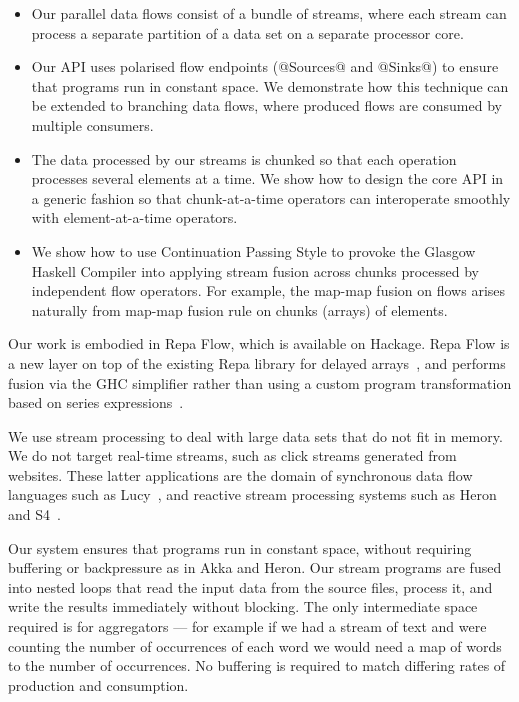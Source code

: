 \begin{itemize}
\item Our parallel data flows consist of a bundle of streams, where each stream can process a separate partition of a data set on a separate processor core.

\item Our API uses polarised flow endpoints (@Sources@ and @Sinks@) to ensure that programs run in constant space. We demonstrate how this technique can be extended to branching data flows, where produced flows are consumed by multiple consumers.

\item The data processed by our streams is chunked so that each operation processes several elements at a time. We show how to design the core API in a generic fashion so that chunk-at-a-time operators can interoperate smoothly with element-at-a-time operators.

\item We show how to use Continuation Passing Style to provoke the Glasgow Haskell Compiler into applying stream fusion across chunks processed by independent flow operators. For example, the map-map fusion on flows arises naturally from map-map fusion rule on chunks (arrays) of elements.
\end{itemize}

Our work is embodied in Repa Flow, which is available on Hackage. Repa Flow is a new layer on top of the existing Repa library for delayed arrays~\cite{Lippmeier:Guiding}, and performs fusion via the GHC simplifier rather than using a custom program transformation based on series expressions~\cite{Lippmeier:DataFlow}.

We use stream processing to deal with large data sets that do not fit in memory. We do not target real-time streams, such as click streams generated from websites. These latter applications are the domain of synchronous data flow languages such as Lucy~\cite{Mandel:Lucy}, and reactive stream processing systems such as Heron~\cite{Kulkarn:Heron} and S4~\cite{Neumeyer:S4}. 

Our system ensures that programs run in constant space, without requiring buffering or backpressure as in Akka and Heron. Our stream programs are fused into nested loops that read the input data from the source files, process it, and write the results immediately without blocking. The only intermediate space required is for aggregators --- for example if we had a stream of text and were counting the number of occurrences of each word we would need a map of words to the number of occurrences. No buffering is required to match differing rates of production and consumption.

